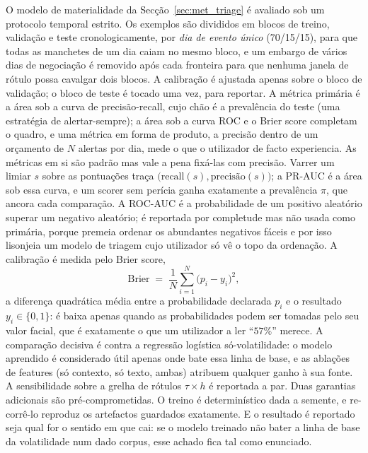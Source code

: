 O modelo de materialidade da Secção~\ref{sec:met_triage} é avaliado sob um protocolo temporal estrito. Os
exemplos são divididos em blocos de treino, validação e teste cronologicamente, por \emph{dia de evento
único} (70/15/15), para que todas as manchetes de um dia caiam no mesmo bloco, e um embargo de vários dias
de negociação é removido após cada fronteira para que nenhuma janela de rótulo possa cavalgar dois blocos. A
calibração é ajustada apenas sobre o bloco de validação; o bloco de teste é tocado uma vez, para reportar. A
métrica primária é a área sob a curva de precisão-recall, cujo chão é a prevalência do teste (uma estratégia
de alertar-sempre); a área sob a curva ROC e o Brier score completam o quadro, e uma métrica em forma de
produto, a precisão dentro de um orçamento de $N$ alertas por dia, mede o que o utilizador de facto
experiencia. As métricas em si são padrão mas vale a pena fixá-las com precisão. Varrer um limiar $s$ sobre
as pontuações traça $\big(\mathrm{recall}(s), \mathrm{precisão}(s)\big)$; a PR-AUC é a área sob essa curva, e
um scorer sem perícia ganha exatamente a prevalência $\pi$, que ancora cada comparação. A ROC-AUC é a
probabilidade de um positivo aleatório superar um negativo aleatório; é reportada por completude mas não
usada como primária, porque premeia ordenar os abundantes negativos fáceis e por isso lisonjeia um modelo de
triagem cujo utilizador só vê o topo da ordenação. A calibração é medida pelo Brier score,
\begin{equation}
\mathrm{Brier} \;=\; \frac{1}{N}\sum_{i=1}^{N}\big(p_i - y_i\big)^2 ,
\label{eq:brier}
\end{equation}
a diferença quadrática média entre a probabilidade declarada $p_i$ e o resultado $y_i \in \{0,1\}$: é baixa
apenas quando as probabilidades podem ser tomadas pelo seu valor facial, que é exatamente o que um
utilizador a ler ``$57\%$'' merece. A comparação decisiva é contra a regressão logística só-volatilidade: o
modelo aprendido é considerado útil apenas onde bate essa linha de base, e as ablações de features (só
contexto, só texto, ambas) atribuem qualquer ganho à sua fonte. A sensibilidade sobre a grelha de rótulos
$\tau \times h$ é reportada a par. Duas garantias adicionais são pré-comprometidas. O treino é determinístico
dada a semente, e re-corrê-lo reproduz os artefactos guardados exatamente. E o resultado é reportado seja
qual for o sentido em que cai: se o modelo treinado não bater a linha de base da volatilidade num dado
corpus, esse achado fica tal como enunciado.

